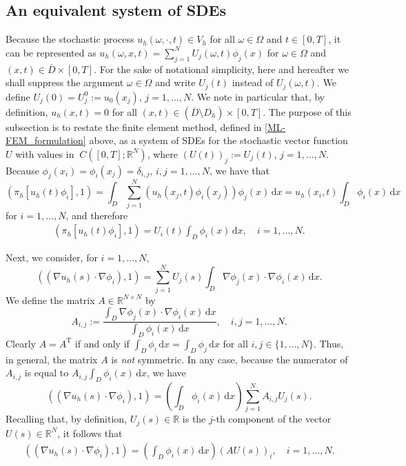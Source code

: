 \documentclass[12pt]{article}
\newcommand{\dd}{\,\mathrm{d}}
\begin{document}
{\subsection{An equivalent system of SDEs}




Because  the stochastic process $u_h(\omega,\cdot,t) \in V_h$ for all $\omega \in \Omega$ and $t \in [0,T]$, it can be represented as $u_h(\omega,x,t) = \sum_{j=1}^N U_j(\omega,t) \phi_j(x)$ for $\omega \in \Omega$ and $(x,t) \in \overline{D} \times [0,T]$. For the sake of notational simplicity, here and hereafter we shall suppress the argument $\omega \in \Omega$ and write $U_j(t)$ instead of $U_j(\omega,t)$. We define $U_j(0)=U_j^0:=u_0(x_j)$, $j=1,\ldots,N$. We note in particular that, by definition, $u_h(x,t)=0$ for all $(x,t) \in (\overline{D}\setminus D_h) \times [0,T]$. The purpose of this subsection is to restate the finite element method, defined in \eqref{ML-FEM_formulation} above, as a system of SDEs for the stochastic vector function $U$ with values in $\ C([0,T];\mathbb{R}^N)$, where $(U(t))_j:=U_j(t)$, $j=1,\ldots,N$.
%
Because $\phi_j(x_i) = \phi_i(x_j) = \delta_{i,j}$, $i,j = 1,\ldots,N$, we have that 
%
\[ (\pi_h[u_h(t) \phi_i], 1) 
= \int_D \sum_{j=1}^N  (u_h(x_j,t)\phi_i(x_j) )\phi_j(x) \dd x = u_h(x_i,t) \int_D \phi_i(x) \dd x\]
%
for $i=1,\ldots,N$, and therefore 
%
\begin{align} \label{eq:L1}
(\pi_h[u_h(t) \phi_i], 1) = U_i(t) \int_D \phi_i(x) \dd x, \quad i=1,\ldots,N.
\end{align}

Next, we consider, for $i=1,\ldots,N$,
%
\[ ( (\nabla u_h(s) \cdot \nabla \phi_i), 1)  
= \sum_{j=1}^N U_j(s) \int_D \nabla \phi_j(x) \cdot \nabla \phi_i(x) \dd x.\] 
%
We define the matrix $A \in \mathbb{R}^{N \times N}$ by 
%
\begin{equation}
\label{eq:matrixA}
A_{i,j}:= \frac{\int_D \nabla \phi_j(x) \cdot \nabla \phi_i(x) \dd x}{\int_D \phi_i(x) \dd x },\quad i,j=1,\ldots,N.
\end{equation}
%
Clearly $A=A^{\mathrm{T}}$ if and only if $\int_D \phi_i \dd x = \int_D \phi_j \dd x$ for all $i,j \in \{1,\ldots,N\}$. Thus, in general, the matrix $A$ is \textit{not} symmetric. In any case, because the numerator of $A_{i,j}$ is equal to $A_{i,j} \int_D \phi_i(x) \dd x$, we have
%
\[ ((\nabla u_h(s) \cdot \nabla \phi_i), 1) = \left(\int_D \phi_i(x) \dd x \right) \sum_{j=1}^N A_{i,j} U_j(s).\]
%
Recalling that, by definition, $U_j(s) \in \mathbb{R}$ is the $j$-th component of the vector $U(s) \in \mathbb{R}^N$, it follows that
%
\begin{align} \label{eq:L2}
((\nabla u_h(s) \cdot \nabla \phi_i), 1) = \left(\int_D \phi_i(x) \dd x \right) (AU(s))_i, \quad i=1,\ldots, N.
\end{align}
%

}
\end{document}
